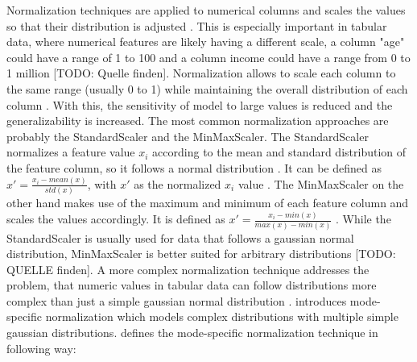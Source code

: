 
\label{sec:dataNormalization} 

Normalization techniques are applied to numerical columns and scales the values so that their distribution is adjusted \cite{garcia2016BigDataPreprocessing}.
This is especially important in tabular data, where numerical features are likely having a different scale, \eg a column "age" could have a range of 1 to 100 and a column income could have a range from 0 to 1 million [TODO: Quelle finden].
Normalization allows to scale each column to the same range (usually 0 to 1) while maintaining the overall distribution of each column \cite{izonin2022TwoStepDataNormalization}.
With this, the sensitivity of \gls{model} to large values is reduced and the generalizability is increased.
The most common normalization approaches are probably the StandardScaler and the MinMaxScaler.
The StandardScaler normalizes a feature value $x_i$ according to the mean and standard distribution of the feature column, so it follows a normal distribution \cite{garcia2016BigDataPreprocessing, izonin2022TwoStepDataNormalization}.
It can be defined as $x' = \frac{x_i-mean(x)}{std(x)}$, with $x'$ as the normalized $x_i$ value \cite{izonin2022TwoStepDataNormalization}.
The MinMaxScaler on the other hand makes use of the maximum and minimum of each feature column and scales the values accordingly.
It is defined as $x' = \frac{x_i - min(x)}{max(x) - min(x)}$ \cite{izonin2022TwoStepDataNormalization}.
While the StandardScaler is usually used for data that follows a gaussian normal distribution, MinMaxScaler is better suited for arbitrary distributions [TODO: QUELLE finden].
A more complex normalization technique addresses the problem, that numeric values in tabular data can follow distributions more complex than just a simple gaussian normal distribution \cite{zhao2022CTABGANEnhancingTabular, xu2019ModelingTabularData}.
\cite{xu2019ModelingTabularData} introduces mode-specific normalization which models complex distributions with multiple simple gaussian distributions.
\cite[p. 3-4]{xu2019ModelingTabularData} defines the mode-specific normalization technique in following way:

